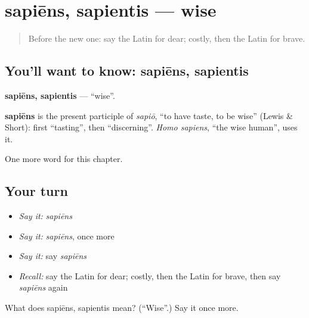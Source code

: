 \section[sapiēns, sapientis]{sapiēns, sapientis — wise}

\label{lesson:LA-C97-sapiens}



\begin{quote}
Before the new one: say the Latin for dear; costly, then the Latin for brave.
\end{quote}

\subsection*{You'll want to know: sapiēns, sapientis}
\textbf{sapiēns, sapientis} — \textquotedblleft{}wise\textquotedblright{}.

\begin{cousinweb}
\textbf{sapiēns} is the present participle of \emph{sapiō}, \textquotedblleft{}to have taste, to be wise\textquotedblright{} (Lewis \& Short): first \textquotedblleft{}tasting\textquotedblright{}, then \textquotedblleft{}discerning\textquotedblright{}. \emph{Homo sapiens}, \textquotedblleft{}the wise human\textquotedblright{}, uses it.
\end{cousinweb}

\begin{grammarlens}[title={What you've built}]
One more word for this chapter.
\end{grammarlens}

\subsection*{Your turn}
\begin{itemize}
\raggedright
  \item \emph{Say it:} \emph{sapiēns}
  \item \emph{Say it:} \emph{sapiēns}, once more
  \item \emph{Say it:} say \emph{sapiēns}
  \item \emph{Recall:} say the Latin for dear; costly, then the Latin for brave, then say \emph{sapiēns} again
\end{itemize}

\begin{tcolorbox}[breakable,colback=teal!4,colframe=teal!35!black,title={Before you move on}]
What does sapiēns, sapientis mean? (\textquotedblleft{}Wise\textquotedblright{}.) Say it once more.
\end{tcolorbox}
